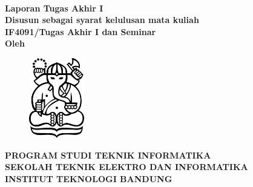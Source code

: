 \clearpage
\pagestyle{empty}


{\selectfont%
    \begin{center}

        \smallskip

        \large{\bfseries \MakeUppercase{\thetitle}}
        \\[2\baselineskip]

        \large{\bfseries Laporan Tugas Akhir I}
        \\[\baselineskip]

        \normalsize{ \bfseries
            Disusun sebagai syarat kelulusan mata kuliah \\
            IF4091/Tugas Akhir I dan Seminar
        }
        \\[3\baselineskip]

        \normalsize{ \bfseries Oleh\\}
        \large{ \bfseries \MakeUppercase{\theauthor}}

        \vfill
        \begin{figure}[h]
            \centering
            \includegraphics[height=3.5cm,keepaspectratio]{resources/cover-ganesha.jpg}
        \end{figure}
        \vfill

        \large{ \bfseries
            \uppercase{
                Program Studi Teknik Informatika \\
                Sekolah Teknik Elektro dan Informatika \\
                Institut Teknologi Bandung\\
            }
            \thismonth
        }

    \end{center}
}%

\restoregeometry
\clearpage
